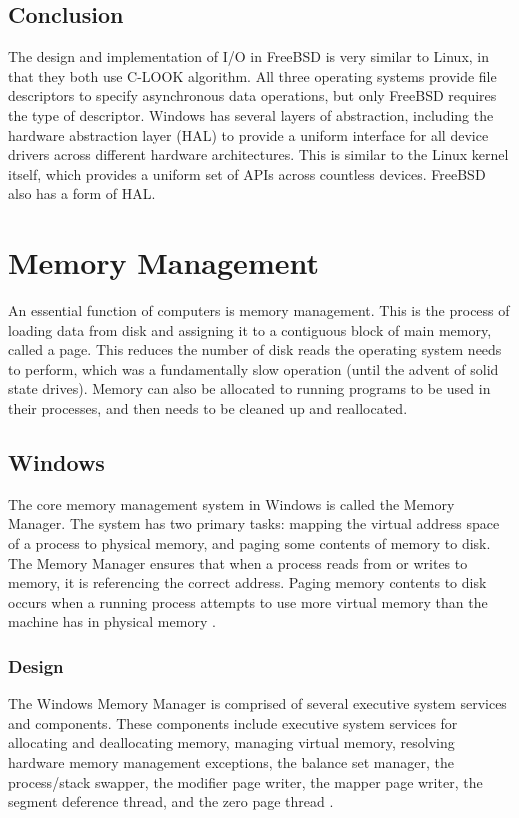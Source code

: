 \documentclass[letterpaper,draftclsnofoot,10pt,onecolumn,titlepage]{IEEEtran}\usepackage[margin=0.75in]{geometry}
\begin{document}
    \subsection{Conclusion}
    The design and implementation of I/O in FreeBSD is very similar to Linux, in that they both use C-LOOK algorithm.
    All three operating systems provide file descriptors to specify asynchronous data operations, but only FreeBSD
    requires the type of descriptor. Windows has several layers of abstraction, including the hardware 
    abstraction layer (HAL) to provide a uniform interface for all device drivers across different hardware 
    architectures. This is similar to the Linux kernel itself, which provides a uniform set of APIs across 
    countless devices. FreeBSD also has a form of HAL.



\section{Memory Management}
An essential function of computers is memory management. This is the process of loading data from disk and assigning
it to a contiguous block of main memory, called a page. This reduces the number of disk reads the operating system 
needs to perform, which was a fundamentally slow operation (until the advent of solid state drives). Memory can 
also be allocated to running programs to be used in their processes, and then needs to be cleaned up and 
reallocated.

    \subsection{Windows}
    The core memory management system in Windows is called the Memory Manager. The system has two primary tasks: mapping 
    the virtual address space of a process to physical memory, and paging some contents of memory to disk. The Memory 
    Manager ensures that when a process reads from or writes to memory, it is referencing the correct address. Paging 
    memory contents to disk occurs when a running process attempts to use more virtual memory than the machine
    has in physical memory \cite{windows}.

        \subsubsection{Design}
        The Windows Memory Manager is comprised of several executive system services and components. These components 
        include executive system services for allocating and deallocating memory, managing virtual 
        memory, resolving hardware memory management exceptions, the balance set manager, the process/stack swapper, 
        the modifier page writer, the mapper page writer, the segment deference thread, and the zero page thread
        \cite{windows}.
\end{document}
